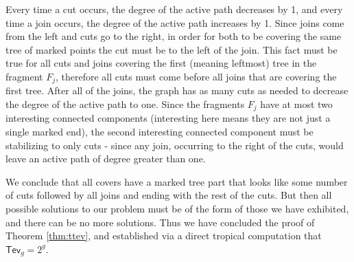\documentclass[11pt,reqno]{amsart}
\theoremstyle{definition}
\newcommand\trop{{\mathtt{trop}}}
\newcommand\Mgn[1]{\mathcal M_{#1}}
\newcommand{\gGamma}{\widehat{\Gamma}}
\newcommand{\Tev}{{\mathsf{Tev}}}
\begin{document}
Every time a cut occurs, the degree of the active path decreases by 1, and every time a join occurs, the degree of the active path increases by 1. %
Since joins come from the left and cuts go to the right, in order for both to be covering the same tree of marked points the cut must be to the left of the join. This fact must be true for all cuts and joins covering the first (meaning leftmost) tree in the fragment $F_j$, therefore all cuts must come before all joins that are covering the first tree. After all of the joins, the graph has as many cuts as needed to decrease the degree of the active path to one. Since the fragments $F_j$ have at most two interesting connected components (interesting here means they are not just a single marked end), the second interesting connected component must be stabilizing to only cuts - since any join, occurring to the right of the cuts, would leave an active path of degree greater than one.

We conclude that all covers have a marked tree part that looks like some number of cuts followed by all joins and ending with the rest of the cuts.
But then all possible solutions to our problem must be of the form of those we have exhibited, and there can be no more solutions.
Thus we have concluded the proof of Theorem \ref{thm:ttev}, and established via a direct tropical computation that $\Tev_g = 2^g$.
\end{document}
